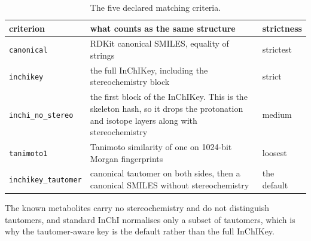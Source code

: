 \begin{table}[h]
\centering\small
\begin{threeparttable}
\caption{The five declared matching criteria.}
\label{tab:si-criteria}
\begin{tabular}{lp{7.2cm}l}
\toprule
criterion & what counts as the same structure & strictness \\
\midrule
\texttt{canonical} & RDKit canonical SMILES, equality of strings & strictest \\
\texttt{inchikey} & the full InChIKey, including the stereochemistry block & strict \\
\texttt{inchi\_no\_stereo} & the first block of the InChIKey. This is the skeleton hash, so it drops the protonation and isotope layers along with stereochemistry & medium \\
\texttt{tanimoto1} & Tanimoto similarity of one on 1024-bit Morgan fingerprints & loosest \\
\texttt{inchikey\_tautomer} & canonical tautomer on both sides, then a canonical SMILES without stereochemistry & the default \\
\bottomrule
\end{tabular}
\begin{tablenotes}[flushleft]\footnotesize
\item The known metabolites carry no stereochemistry and do not distinguish tautomers, and standard InChI normalises only a subset of tautomers, which is why the tautomer-aware key is the default rather than the full InChIKey.
\end{tablenotes}
\end{threeparttable}
\end{table}
